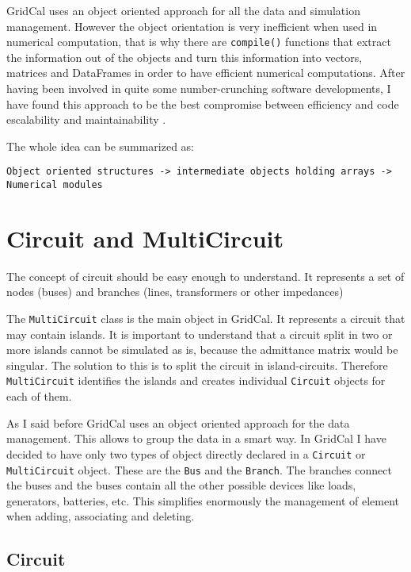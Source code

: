 \documentclass[11pt,fleqn]{book} %
\begin{document}
GridCal uses an object oriented approach for all the data and simulation management. However the object orientation is very inefficient when used in numerical computation, that is why there are \verb|compile()| functions that extract the information out of the objects and turn this information into vectors, matrices and DataFrames in order to have efficient numerical computations. After having been involved in quite some number-crunching software developments, I have found this approach to be the best compromise between efficiency and code escalability and maintainability .

The whole idea can be summarized as:

\begin{verbatim}
Object oriented structures -> intermediate objects holding arrays -> Numerical modules
\end{verbatim}




\section{Circuit and MultiCircuit}

The concept of circuit should be easy enough to understand. It represents a set of nodes (buses) and branches (lines, transformers or other impedances)


The \verb|MultiCircuit| class is the main object in GridCal. It represents a circuit that may contain islands. It is important to understand that a circuit split in two or more islands cannot be simulated as is, because the admittance matrix would be singular. The solution to this is to split the circuit in island-circuits. Therefore \verb|MultiCircuit| identifies the islands and creates individual \verb|Circuit| objects for each of them.

As I said before GridCal uses an object oriented approach for the data management. This allows to group the data in a smart way. In GridCal I have decided to have only two types of object directly declared in a \verb|Circuit| or \verb|MultiCircuit| object. These are the \verb|Bus| and the \verb|Branch|. The branches connect the buses and the buses contain all the other possible devices like loads, generators, batteries, etc. This simplifies enormously the management of element when adding, associating and deleting.

\subsection{Circuit}
\end{document}
